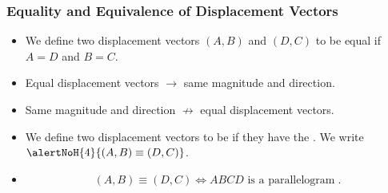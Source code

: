 \begin{frame}
\frametitle{Equality and Equivalence of Displacement Vectors}
\begin{itemize}
\item<1-> We define two displacement vectors $(A,B)$ and $(D,C)$ to be equal if $A=D$ and $B=C$.
\item<2-> Equal displacement vectors $\rightarrow$ same magnitude and direction.
\item<3-> Same magnitude and direction $\not\rightarrow$ equal displacement vectors. 

\item<4-> We define two displacement vectors to be  if they have the . We write $\alertNoH{4}{(A,B) \equiv (D,C)}$.
\item<5-> 
\[ 
(A, B) \equiv (D,C) \Longleftrightarrow ABCD \text{ is a parallelogram}\;.
\]
\end{itemize}
\end{frame}